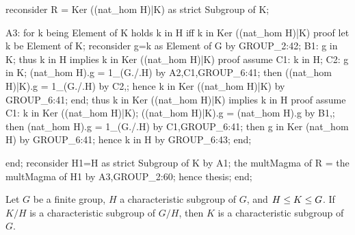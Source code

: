   reconsider R = Ker ((nat_hom H)|K) as strict Subgroup of K;

  A3: for k being Element of K
  holds k in H iff k in Ker ((nat_hom H)|K)
  proof
    let k be Element of K;
    reconsider g=k as Element of G by GROUP_2:42;
    B1: g in K;
    thus k in H implies k in Ker ((nat_hom H)|K)
    proof
      assume C1: k in H;
      C2: g in K;
      (nat_hom H).g = 1_(G./.H) by A2,C1,GROUP_6:41;
      then ((nat_hom H)|K).g = 1_(G./.H) by C2,;
      hence k in Ker ((nat_hom H)|K) by GROUP_6:41;
    end;
    thus k in Ker ((nat_hom H)|K) implies k in H
    proof
      assume C1: k in Ker ((nat_hom H)|K);
      ((nat_hom H)|K).g = (nat_hom H).g by B1,;
      then (nat_hom H).g = 1_(G./.H) by C1,GROUP_6:41;
      then g in Ker (nat_hom H) by GROUP_6:41;
      hence k in H by GROUP_6:43;
    end;

  end;
  reconsider H1=H as strict Subgroup of K by A1;
  the multMagma of R = the multMagma of H1 by A3,GROUP_2:60;
  hence thesis;
end;
\eatline
{}\nwendcode{}\nwdocspar
\begin{theorem}
Let $G$ be a finite group, $H$ a characteristic subgroup of $G$, and
$H\leq K\leq G$. If $K/H$ is a characteristic subgroup of $G/H$,
then $K$ is a characteristic subgroup of $G$.
\end{theorem}

